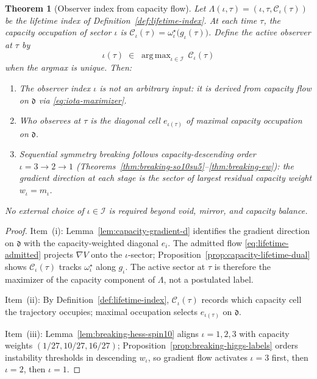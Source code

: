 \documentclass[aps,prd,onecolumn,amsmath,amssymb,nofootinbib,11pt]{revtex4-2}
\numberwithin{equation}{section}
\theoremstyle{plain}
\newtheorem{theorem}{Theorem}[section]
\theoremstyle{definition}
\theoremstyle{remark}
\newcommand{\capacity}{\mathcal{C}}
\DeclareMathOperator{\argmax}{arg\,max}
\begin{document}
\begin{theorem}[Observer index from capacity flow]\label{thm:iota-derived}
Let $\Lambda(\iota,\tau)=(\iota,\tau,\capacity_\iota(\tau))$ be the lifetime
index of Definition~\ref{def:lifetime-index}. At each time $\tau$, the
capacity occupation of sector $\iota$ is
$\capacity_\iota(\tau)=\omega^\star_\iota\bigl(g_\iota(\tau)\bigr)$.
Define the \emph{active observer} at $\tau$ by
\begin{equation}\label{eq:iota-maximizer}
  \iota(\tau)\;\in\;\argmax_{\iota\in\mathcal{I}}\,\capacity_\iota(\tau)
\end{equation}
when the argmax is unique. Then:
\begin{enumerate}[label=(\roman*),leftmargin=*]
  \item The observer index $\iota$ is \emph{not} an arbitrary input: it is
    derived from capacity flow on $\mathfrak{d}$ via
    \eqref{eq:iota-maximizer}.
  \item \emph{Who observes at $\tau$} is the diagonal cell $e_{\iota(\tau)}$
    of maximal capacity occupation on $\mathfrak{d}$.
  \item Sequential symmetry breaking follows capacity-descending order
    $\iota=3\to2\to1$
    (Theorems~\ref{thm:breaking-so10su5}--\ref{thm:breaking-ew}): the gradient
    direction at each stage is the sector of largest residual capacity weight
    $w_\iota=m_\iota$.
\end{enumerate}
No external choice of $\iota\in\mathcal{I}$ is required beyond void, mirror,
and capacity balance.
\end{theorem}

\begin{proof}
Item~(i): Lemma~\ref{lem:capacity-gradient-d} identifies the gradient
direction on $\mathfrak{d}$ with the capacity-weighted diagonal $e_i$. The
admitted flow \eqref{eq:lifetime-admitted} projects $\nabla V$ onto the
$\iota$-sector; Proposition~\ref{prop:capacity-lifetime-dual} shows
$\capacity_\iota(\tau)$ tracks $\omega^\star_\iota$ along $g_\iota$. The
active sector at $\tau$ is therefore the maximizer of the capacity component
of $\Lambda$, not a postulated label.

Item~(ii): By Definition~\ref{def:lifetime-index}, $\capacity_\iota(\tau)$
records which capacity cell the trajectory occupies; maximal occupation
selects $e_{\iota(\tau)}$ on $\mathfrak{d}$.

Item~(iii): Lemma~\ref{lem:breaking-hess-spin10} aligns
$\iota=1,2,3$ with capacity weights $(1/27,10/27,16/27)$;
Proposition~\ref{prop:breaking-higgs-labels} orders instability thresholds in
descending $w_\iota$, so gradient flow activates $\iota=3$ first, then
$\iota=2$, then $\iota=1$.
\end{proof}
\end{document}
